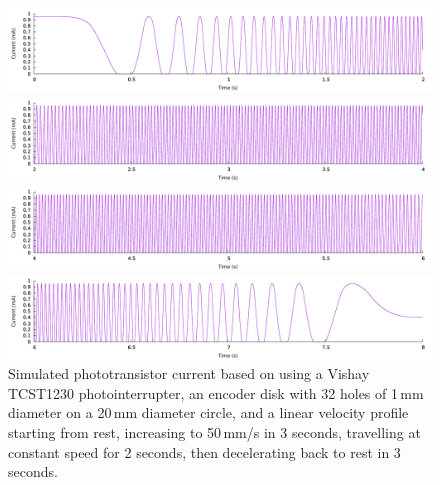 \documentclass[a4paper,11pt,article]{memoir}
\begin{document}
\begin{figure}
  \begin{center}
    \includegraphics[width=\textwidth]{simulation-1}
  \end{center}
  \begin{center}
    \includegraphics[width=\textwidth]{simulation-2}
  \end{center}
  \begin{center}
    \includegraphics[width=\textwidth]{simulation-3}
  \end{center}
  \begin{center}
    \includegraphics[width=\textwidth]{simulation-4}
  \end{center}

  \caption{Simulated phototransistor current based on using a Vishay
    TCST1230 photointerrupter, an encoder disk with 32 holes of 1\,mm
    diameter on a 20\,mm diameter circle, and a linear velocity
    profile starting from rest, increasing to 50\,mm/s in 3 seconds,
    travelling at constant speed for 2 seconds, then decelerating back
    to rest in 3 seconds.}\label{fig:simulation}
\end{figure}
\end{document}
